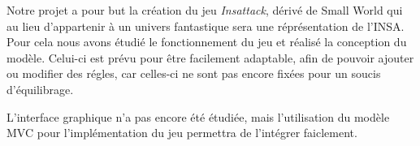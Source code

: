 Notre projet a pour but la création du jeu \emph{Insattack}, dérivé de Small World qui au lieu d'appartenir à un univers fantastique sera une réprésentation de l'INSA. Pour cela nous avons étudié le fonctionnement du jeu et réalisé la conception du modèle. Celui-ci est prévu pour être facilement adaptable, afin de pouvoir ajouter ou modifier des régles, car celles-ci ne sont pas encore fixées pour un soucis d'équilibrage.

L'interface graphique n'a pas encore été étudiée, mais l'utilisation du modèle MVC pour l'implémentation du jeu permettra de l'intégrer faiclement.
